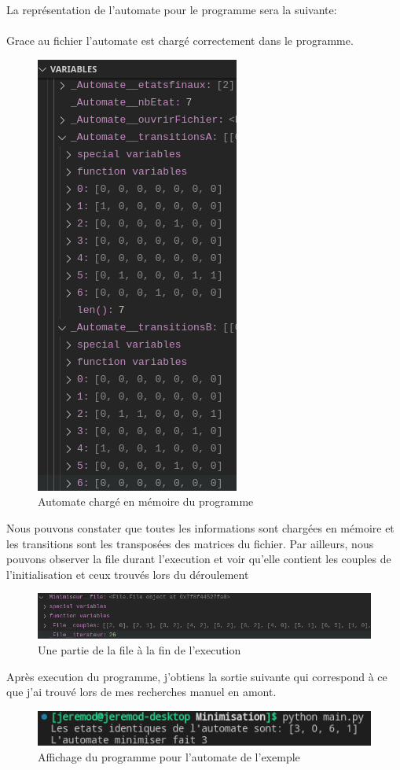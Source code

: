 \documentclass[a4paper]{article}
\begin{document}
La représentation de l'automate pour le programme sera la suivante:\\

\fbox{
	
}\\

Grace au fichier l'automate est chargé correctement dans le programme.\\

\begin{figure}[!h]
	\centering
	\includegraphics[scale=0.4]{src/autoCharge.png}
	\caption{Automate chargé en mémoire du programme}
\end{figure}

Nous pouvons constater que toutes les informations sont chargées en mémoire
et les transitions sont les transposées des matrices du fichier. Par ailleurs, 
nous pouvons observer la file durant l'execution et voir qu'elle contient
les couples de l'initialisation et ceux trouvés lors du déroulement

\begin{figure}[!h]
	\centering
	\includegraphics[scale=0.5]{src/fileExecution.png}
	\caption{Une partie de la file à la fin de l'execution}
\end{figure}

Après execution du programme, j'obtiens la sortie suivante qui correspond à ce
que j'ai trouvé lors de mes recherches manuel en amont.

\begin{figure}[!h]
	\centering
	\includegraphics[scale=0.5]{src/resultat_auto1.png}
	\caption{Affichage du programme pour l'automate de l'exemple}
\end{figure}
\end{document}
